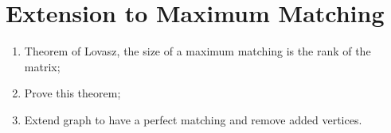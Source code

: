 \chapter{Extension to Maximum Matching}
\begin{enumerate}
    \item Theorem of Lovasz, the size of a maximum matching is the rank of the matrix;
    \item Prove this theorem;
    \item Extend graph to have a perfect matching and remove added vertices.
\end{enumerate}